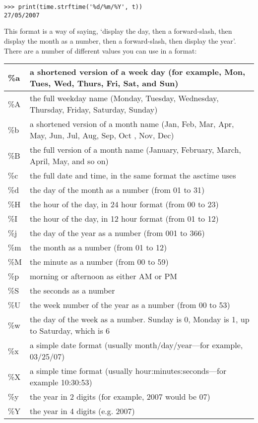 \begin{Verbatim}[frame=single]
>>> print(time.strftime('%d/%m/%Y', t))
27/05/2007
\end{Verbatim}

This format is a way of saying, `display the day, then a forward-slash, then display the month as a number, then a forward-slash, then display the year'.  There are a number of different values you can use in a format:

\begin{center}
\begin{tabular}{|l|p{12cm}|}
\hline
\%a & a shortened version of a week day (for example, Mon, Tues, Wed, Thurs, Fri, Sat, and Sun) \\
\hline
\%A & the full weekday name (Monday, Tuesday, Wednesday, Thursday, Friday, Saturday, Sunday) \\
\hline
\%b & a shortened version of a month name (Jan, Feb, Mar, Apr, May, Jun, Jul, Aug, Sep, Oct , Nov, Dec) \\
\hline
\%B & the full version of a month name (January, February, March, April, May, and so on) \\
\hline
\%c & the full date and time, in the same format the asctime uses \\
\hline
\%d & the day of the month as a number (from 01 to 31) \\
\hline
\%H & the hour of the day, in 24 hour format (from 00 to 23) \\
\hline
\%I & the hour of the day, in 12 hour format (from 01 to 12) \\
\hline
\%j & the day of the year as a number (from 001 to 366) \\
\hline
\%m & the month as a number (from 01 to 12) \\
\hline
\%M & the minute as a number (from 00 to 59) \\
\hline
\%p & morning or afternoon as either AM or PM \\
\hline
\%S & the seconds as a number \\
\hline
\%U & the week number of the year as a number (from 00 to 53) \\
\hline
\%w & the day of the week as a number.  Sunday is 0, Monday is 1, up to Saturday, which is 6 \\
\hline
\%x & a simple date format (usually month/day/year---for example, 03/25/07) \\
\hline
\%X & a simple time format (usually hour:minutes:seconds---for example 10:30:53) \\
\hline
\%y & the year in 2 digits (for example, 2007 would be 07) \\
\hline
\%Y & the year in 4 digits (e.g. 2007) \\
\hline
\end{tabular}
\end{center}

